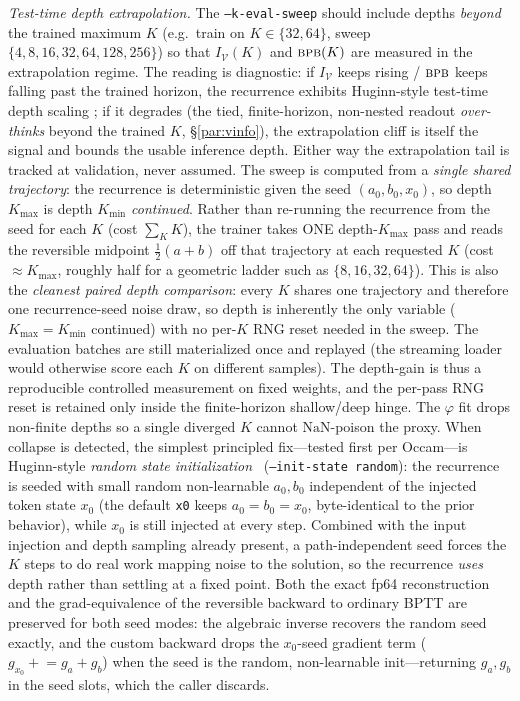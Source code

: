 \documentclass[11pt]{article}
\newcommand{\bpb}{\textsc{bpb}}
\newcommand{\code}[1]{\texttt{#1}}
\begin{document}
\emph{Test-time depth extrapolation.}  The \code{--k-eval-sweep} should include depths \emph{beyond}
the trained maximum \(K\) (e.g.\ train on \(K\in\{32,64\}\), sweep \(\{4,8,16,32,64,128,256\}\)) so that
\(I_{\mathcal V}(K)\) and \(\bpb(K)\) are measured in the extrapolation regime.  The reading is
diagnostic: if \(I_{\mathcal V}\) keeps rising / \(\bpb\) keeps falling past the trained horizon, the
recurrence exhibits Huginn-style test-time depth scaling \cite{huginn}; if it degrades (the tied,
finite-horizon, non-nested readout \emph{over-thinks} beyond the trained \(K\), \S\ref{par:vinfo}), the
extrapolation cliff is itself the signal and bounds the usable inference depth.  Either way the
extrapolation tail is tracked at validation, never assumed.
The sweep is computed from a \emph{single shared trajectory}: the recurrence is deterministic given
the seed \((a_0,b_0,x_0)\), so depth \(K_{\max}\) is depth \(K_{\min}\) \emph{continued}.  Rather than
re-running the recurrence from the seed for each \(K\) (cost \(\sum_K K\)), the trainer takes ONE
depth-\(K_{\max}\) pass and reads the reversible midpoint \(\tfrac12(a+b)\) off that trajectory at each
requested \(K\) (cost \(\approx K_{\max}\), roughly half for a geometric ladder such as
\(\{8,16,32,64\}\)).  This is also the \emph{cleanest paired depth comparison}: every \(K\) shares one
trajectory and therefore one recurrence-seed noise draw, so depth is inherently the only variable
(\(K_{\max}=K_{\min}\) continued) with no per-\(K\) RNG reset needed in the sweep.  The evaluation
batches are still materialized once and replayed (the streaming loader would otherwise score each
\(K\) on different samples).  The depth-gain is thus a reproducible controlled measurement on fixed
weights, and the per-pass RNG reset is retained only inside the finite-horizon shallow/deep hinge.
The \(\varphi\) fit drops non-finite depths so a single
diverged \(K\) cannot \(\mathrm{NaN}\)-poison the proxy.  When collapse is detected, the
simplest principled fix---tested first per Occam---is Huginn-style \emph{random state
initialization}~\cite{huginn} (\code{--init-state random}): the recurrence is seeded with small
random non-learnable \(a_0,b_0\) independent of the injected token state \(x_0\) (the default
\code{x0} keeps \(a_0=b_0=x_0\), byte-identical to the prior behavior), while \(x_0\) is still
injected at every step.  Combined with the input injection and depth sampling already present, a
path-independent seed forces the \(K\) steps to do real work mapping noise to the solution, so the
recurrence \emph{uses} depth rather than settling at a fixed point.  Both the exact fp64
reconstruction and the grad-equivalence of the reversible backward to ordinary BPTT are preserved
for both seed modes: the algebraic inverse recovers the random seed exactly, and the custom backward
drops the \(x_0\)-seed gradient term (\(g_{x_0}\mathrel{+}=g_a+g_b\)) when the seed is the random,
non-learnable init---returning \(g_a,g_b\) in the seed slots, which the caller discards.
\end{document}
